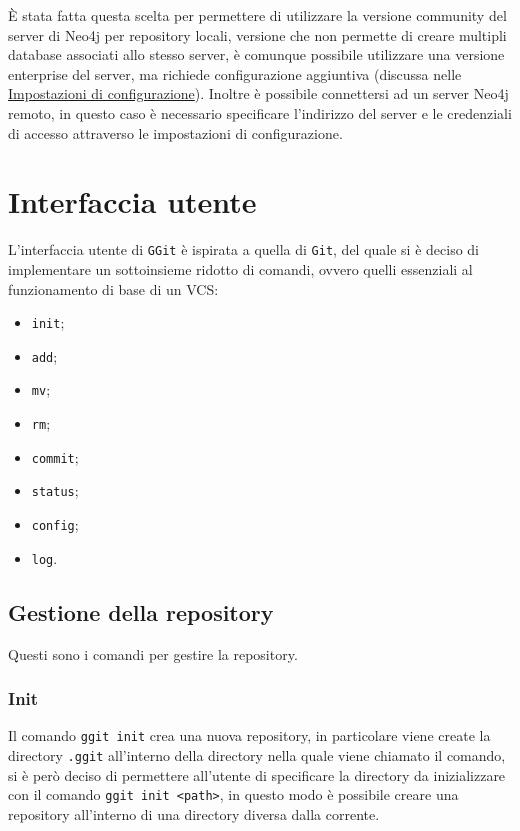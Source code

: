 È stata fatta questa scelta per permettere di utilizzare la versione community del server di Neo4j per repository locali, versione che non permette di creare multipli database associati allo stesso server, è comunque possibile utilizzare una versione enterprise del server, ma richiede configurazione aggiuntiva (discussa nelle \hyperref[sec:impostazioni]{Impostazioni di configurazione}).
Inoltre è possibile connettersi ad un server Neo4j remoto, in questo caso è necessario specificare l'indirizzo del server e le credenziali di accesso attraverso le impostazioni di configurazione.

\section{Interfaccia utente}
\label{sec:interfaccia}
L'interfaccia utente di \texttt{GGit} è ispirata a quella di \texttt{Git}, del quale si è deciso di implementare un sottoinsieme ridotto di comandi, ovvero quelli essenziali al funzionamento di base di un VCS:
\begin{itemize}
    \item \texttt{init};
    \item \texttt{add};
    \item \texttt{mv};
    \item \texttt{rm};
    \item \texttt{commit};
    \item \texttt{status};
    \item \texttt{config};
    \item \texttt{log}.
\end{itemize}

\subsection{Gestione della repository}
Questi sono i comandi per gestire la repository.

\subsubsection{Init}
Il comando \texttt{ggit init} crea una nuova repository, in particolare viene create la directory \texttt{.ggit} all'interno della directory nella quale viene chiamato il comando, si è però deciso di permettere all'utente di specificare la directory da inizializzare con il comando \texttt{ggit init <path>}, in questo modo è possibile creare una repository all'interno di una directory diversa dalla corrente.

